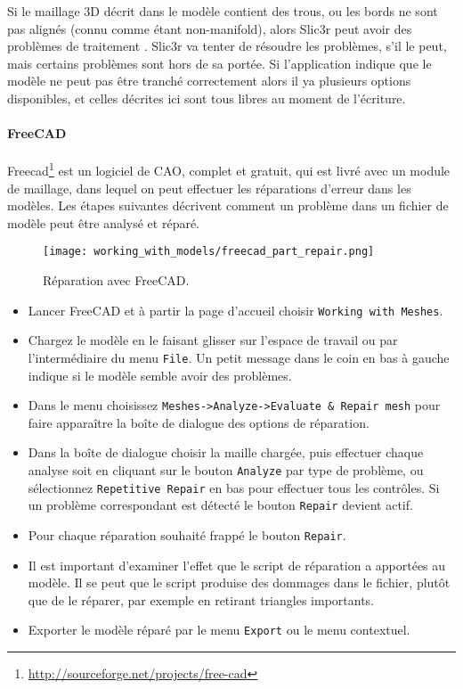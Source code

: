 
Si le maillage 3D d\'ecrit dans le mod\`ele contient des trous, ou les bords ne sont pas align\'es (connu comme \'etant non-manifold), alors Slic3r peut avoir des probl\`emes de traitement . Slic3r va tenter de r\'esoudre les probl\`emes, s'il le peut, mais certains probl\`emes sont hors de sa port\'ee. Si l'application indique que le mod\`ele ne peut pas \^etre tranch\'e correctement alors il ya plusieurs options disponibles, et celles d\'ecrites ici sont tous libres au moment de l'\'ecriture.

{}

\paragraph{FreeCAD} %
\label{par:freecad}

Freecad\footnote{\url{http://sourceforge.net/projects/free-cad}} est un logiciel de CAO, complet et gratuit, qui est livr\'e avec un module de maillage, dans lequel on peut effectuer les r\'eparations d'erreur dans les mod\`eles. Les \'etapes suivantes d\'ecrivent comment un probl\`eme dans un fichier de mod\`ele peut \^etre analys\'e et r\'epar\'e.

\begin{figure}[H]
\centering
\texttt{[image: working\_with\_models/freecad\_part\_repair.png]}
\caption{R\'eparation avec FreeCAD.}
\label{fig:freecad_part_repair}
\end{figure}

\begin{itemize}
	\item Lancer FreeCAD et \`a partir la page d'accueil choisir \texttt{Working with Meshes}.
	\item Chargez le mod\`ele en le faisant glisser sur l'espace de travail ou par l'interm\'ediaire du menu \texttt{File}.  Un petit message dans le coin en bas \`a gauche indique si le mod\`ele semble avoir des probl\`emes.
	\item Dans le menu choisissez \texttt{Meshes->Analyze->Evaluate \& Repair mesh} pour faire appara\^itre la bo\^ite de dialogue des options de r\'eparation.
	\item Dans la bo\^ite de dialogue choisir la maille charg\'ee, puis effectuer chaque analyse soit en cliquant sur le bouton \texttt{Analyze} par type de probl\`eme, ou s\'electionnez \texttt{Repetitive Repair} en bas pour effectuer tous les contr\^oles. Si un probl\`eme  correspondant est d\'etect\'e le bouton \texttt{Repair} devient actif.
	\item Pour chaque r\'eparation souhait\'e frapp\'e le bouton \texttt{Repair}.
	\item Il est important d'examiner l'effet que le script de r\'eparation a apport\'ees au mod\`ele.  Il se peut que le script produise des dommages dans le fichier, plut\^ot que de le r\'eparer, par exemple en retirant triangles importants.
	\item Exporter le mod\`ele r\'epar\'e par le menu \texttt{Export} ou le menu contextuel.
\end{itemize}
